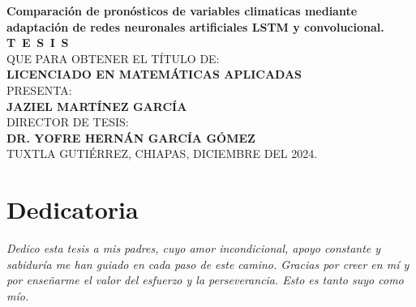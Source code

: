 \begin{titlepage}
\begin{minipage}[t][0.79\textheight][c]{0.06\textwidth}
\begin{minipage}[b][0.08\textheight][b]{0.2\textwidth}
    \end{minipage}
\end{minipage}\hspace{1.2cm} 
\begin{minipage}[t][0.95\textheight][c]{0.9\textwidth}
	\vspace{2cm}
    \begin{center}
        {\Large\bfseries  Comparación de pronósticos de variables climaticas mediante adaptación de redes neuronales artificiales LSTM y convolucional.}\\[1.5cm]
        \textsc{\huge \textbf{T\, E\, S\, I\, S}}\\[1.5cm]
        \textsc{\large QUE PARA OBTENER EL TÍTULO DE:}\\[0.3cm]
        \textbf{\textsc{LICENCIADO EN MATEMÁTICAS APLICADAS}}\\[1.5cm]
        \textsc{\large PRESENTA:}\\[0.3cm]
        \textbf{\textsc{\large {JAZIEL MARTÍNEZ GARCÍA}}}\\[2cm]
        {\large\scshape DIRECTOR DE TESIS:\\[0.3cm]
        {\textbf{\large DR. YOFRE HERNÁN GARCÍA GÓMEZ }}}\\[2.0cm]
        \large{TUXTLA GUTIÉRREZ, CHIAPAS, DICIEMBRE DEL 2024.}
    \end{center}
    \vspace{2cm} %
  
\end{minipage} 
\end{titlepage}

\pagebreak[2]

\chapter*{Dedicatoria}
\begin{flushright}
\textit{Dedico esta tesis a mis padres, cuyo amor incondicional, apoyo constante y sabiduría me han guiado en cada paso de este camino. Gracias por creer en mí y por enseñarme el valor del esfuerzo y la perseverancia. Esto es tanto suyo como mío.}
\end{flushright}


